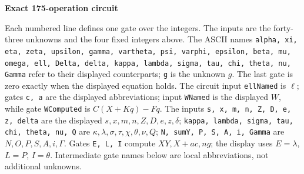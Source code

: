 \documentclass[10pt]{article}
\begin{document}
\clearpage
\begin{center}{\large\bfseries Exact 175-operation circuit}\end{center}
Each numbered line defines one gate over the integers. The inputs are the
forty-three unknowns and the four fixed integers above. The ASCII names
\texttt{alpha, xi, eta, zeta, upsilon, gamma, vartheta, psi, varphi, epsilon, beta, mu, omega, ell, Delta, delta, kappa, lambda, sigma, tau, chi, theta, nu, Gamma}
refer to their displayed counterparts; \texttt{g} is the unknown $g$. The last
gate is zero exactly when the displayed equation holds. The circuit input
\texttt{ellNamed} is $\ell$; gates \texttt{c, a} are the displayed abbreviations; input \texttt{WNamed} is the
displayed $W$, while gate \texttt{WComputed} is $C(X+Kq)-Fq$. The inputs
\texttt{s, x, m, n, Z, D, e, z, delta} are the displayed
$s,x,m,n,Z,D,e,z,\delta$; \texttt{kappa, lambda, sigma, tau, chi, theta, nu, Q}
are $\kappa,\lambda,\sigma,\tau,\chi,\theta,\nu,Q$; \texttt{N, sumY, P, S, A, i, Gamma}
are $N,O,P,S,A,i,\Gamma$. Gates \texttt{E, L, I} compute $XY,X+ac,ng$;
the display uses $E=\lambda$, $L=P$, $I=\theta$. Intermediate gate
names below are local abbreviations, not additional unknowns.
\end{document}
